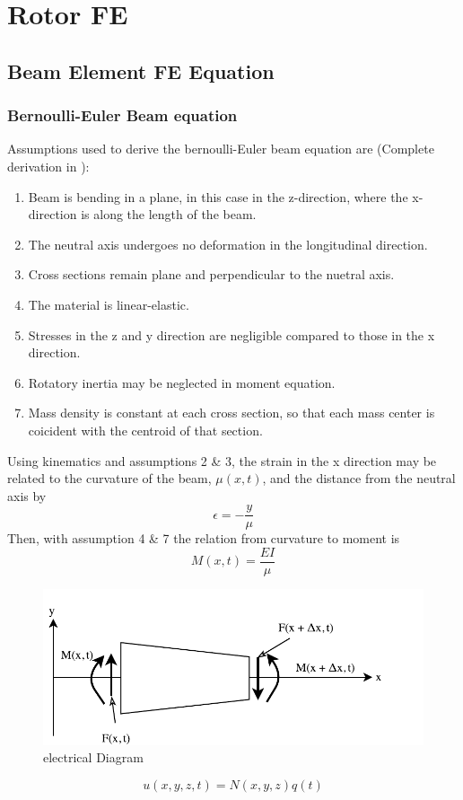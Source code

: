\chapter{Rotor FE}
\section{Beam Element FE Equation}
\subsection{Bernoulli-Euler Beam equation}
Assumptions used to derive the bernoulli-Euler beam equation are (Complete derivation in \cite{craig2006fundamentals}):
\begin{enumerate}
	\item Beam is bending in a plane, in this case in the z-direction, where the x-direction is along the length of the beam.
	\item The  neutral axis undergoes no deformation in the longitudinal direction.
	\item Cross sections remain plane and perpendicular to the nuetral axis.
	\item The material is linear-elastic.
	\item Stresses in the z and y direction are negligible compared to those in the x direction.
	\item Rotatory inertia may be neglected in moment equation.
	\item Mass density is constant at each cross section, so that each mass center is coicident with the centroid of that section.
\end{enumerate}
Using kinematics and assumptions 2 \& 3, the strain in the x direction may be related to the curvature of the beam, $\mu(x,t)$, and the distance from the neutral axis by
\begin{equation} \label{eq:curvature}
\epsilon=-\dfrac{y}{\mu}
\end{equation}
Then, with assumption 4 \& 7 the relation from curvature to moment is
\begin{equation}
M(x,t)=\dfrac{EI}{\mu}
\end{equation}
\begin{figure}
	\includegraphics[]{figures/BeamFBD.pdf}
	\caption{electrical Diagram}
	\label{fig:diagram}
\end{figure}
\begin{equation} \label{eq:FEGoverning}
u(x,y,z,t)=N(x,y,z)q(t)
\end{equation}